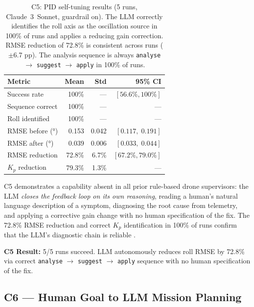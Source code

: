 \begin{table}[ht]
  \caption{C5: PID self-tuning results (5 runs, Claude~3~Sonnet, guardrail on).
    The LLM correctly identifies the roll axis as the oscillation source in
    100\% of runs and applies a reducing gain correction. RMSE reduction of
    72.8\% is consistent across runs ($\pm$6.7 pp). The analysis sequence
    is always \texttt{analyse} $\to$ \texttt{suggest} $\to$ \texttt{apply}
    in 100\% of runs.}
  \label{tab:ch3_c5}
  \centering
  \small
  \begin{tabular}{lrrr}
    \toprule
    Metric & Mean & Std & 95\% CI \\
    \midrule
    Success rate     & 100\%    & ---    & $[56.6\%, 100\%]$ \\
    Sequence correct & 100\%    & ---    & --- \\
    Roll identified  & 100\%    & ---    & --- \\
    RMSE before (°)  & 0.153    & 0.042  & $[0.117,\; 0.191]$ \\
    RMSE after (°)   & 0.039    & 0.006  & $[0.033,\; 0.044]$ \\
    RMSE reduction   & 72.8\%   & 6.7\%  & $[67.2\%, 79.0\%]$ \\
    $K_p$ reduction  & 79.3\%   & 1.3\%  & --- \\
    \bottomrule
  \end{tabular}
\end{table}

C5 demonstrates a capability absent in all prior rule-based drone supervisors:
the LLM \emph{closes the feedback loop on its own reasoning}, reading a human's
natural language description of a symptom, diagnosing the root cause from
telemetry, and applying a corrective gain change with no human specification
of the fix. The 72.8\% RMSE reduction and correct $K_p$ identification in
100\% of runs confirm that the LLM's diagnostic chain is reliable
\cite{vemprala2023chatgpt}.

\textbf{C5 Result:} 5/5 runs succeed. LLM autonomously reduces roll RMSE
by 72.8\% via correct \texttt{analyse} $\to$ \texttt{suggest} $\to$
\texttt{apply} sequence with no human specification of the fix.

\subsection{C6 --- Human Goal to LLM Mission Planning}
\label{sec:ch3_c6}

